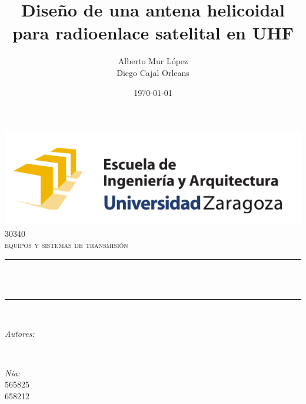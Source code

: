 \documentclass[12pt]{article}
\title{Diseño de una antena helicoidal \\para radioenlace satelital en UHF}
\author{Alberto Mur López \\ Diego Cajal Orleans}
\date{\today}
\makeatletter
\let\thetitle\@title
\let\theauthor\@author
\let\thedate\@date
\makeatother
\begin{document}

\begin{titlepage}
	\centering
    \vspace*{0.5 cm}
    \includegraphics[scale = 0.75]{eina.png}\\[1.0 cm]	%
	\textsc{\Large 30340}\\[0.5 cm]				%
	\textsc{\large equipos y sistemas de transmisión}\\[0.5 cm]				%
	\rule{\linewidth}{0.2 mm} \\[0.4 cm]
	\setlength{\baselineskip}{2\baselineskip}
	{ \huge \bfseries \thetitle}\\
	\rule{\linewidth}{0.2 mm} \\[1.5 cm]
	
	\begin{minipage}{0.4\textwidth}
		\begin{flushleft} \large
			\emph{Autores:}\\
			\theauthor
			\end{flushleft}
			\end{minipage}~
			\begin{minipage}{0.4\textwidth}
			\begin{flushright} \large
			\emph{Nia:} \\
			565825 \\
			658212
		\end{flushright}
	\end{minipage}\\[2 cm]
	
	{\large \thedate}\\[2 cm]
 
	\vfill
	
\end{titlepage}

\end{document}
